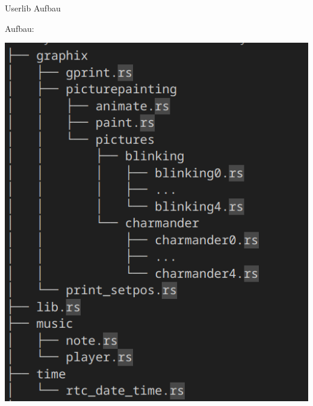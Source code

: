 \begin{frame}{Userlib Aufbau}
    \begin{Large}
        Aufbau: \tiny \cite{usrlib-repo}
    \end{Large}
    \vspace{5pt}
    

    \begin{minipage}[t]{0.48\textwidth}
        \centering
        \includegraphics[height=0.7\textheight]{fig/Code Screens/Tree 1.png} 
    \end{minipage}
    \hfill
    \begin{minipage}[t]{0.48\textwidth}
        \centering

\end{minipage}
\end{frame}
